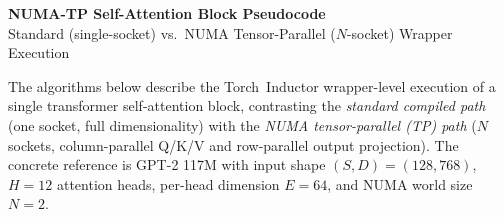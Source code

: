 \documentclass{article}
\begin{document}
\begin{center}
  {\large\bfseries NUMA-TP Self-Attention Block Pseudocode}\\[6pt]
  {\normalsize Standard (single-socket) vs.\ NUMA Tensor-Parallel ($N$-socket) Wrapper Execution}
\end{center}

\bigskip

\noindent
The algorithms below describe the Torch~Inductor wrapper-level execution of a single
transformer self-attention block, contrasting the \emph{standard compiled path} (one
socket, full dimensionality) with the \emph{NUMA tensor-parallel (TP) path} ($N$
sockets, column-parallel Q/K/V and row-parallel output projection).
The concrete reference is GPT-2 117M with input shape $(S,D)=(128,768)$, $H=12$
attention heads, per-head dimension $E=64$, and NUMA world size $N=2$.

\end{document}
